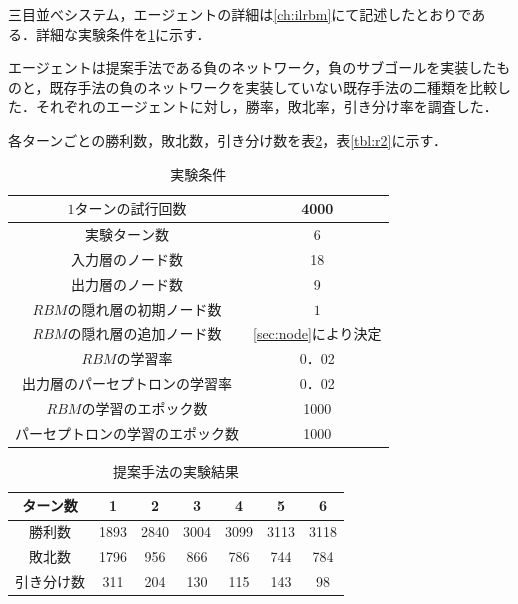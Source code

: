 三目並べシステム，エージェントの詳細は\ref{ch:ilrbm}にて記述したとおりである．詳細な実験条件を\ref{tbl:exp}に示す．

エージェントは提案手法である負のネットワーク，負のサブゴールを実装したものと，既存手法の負のネットワークを実装していない既存手法\cite{osawa}の二種類を比較した．それぞれのエージェントに対し，勝率，敗北率，引き分け率を調査した．

各ターンごとの勝利数，敗北数，引き分け数を表\ref{tbl:r1}，表\ref{tbl:r2}に示す．

\begin{table}[]
\begin{center}
	\caption{実験条件}
	\label{tbl:exp}
	\begin{tabular}{|c|c|}
		\hline
		$ 1ターンの試行回数					$	& 4000	\\ \hline
		$ 実験ターン数	$	& 6	\\ \hline
		$ 入力層のノード数 $	& 18	\\ \hline
		$ 出力層のノード数 $	& 9	\\ \hline
		$ RBMの隠れ層の初期ノード数 $& $1$\\ \hline
		$ RBMの隠れ層の追加ノード数		$	& \ref{sec:node}により決定	\\ \hline
		$ RBMの学習率					$	& 0．02	\\ \hline
		$ 出力層のパーセプトロンの学習率 $	& 0．02	\\ \hline
		$ RBMの学習のエポック数 $	& 1000	\\ \hline
		$ パーセプトロンの学習のエポック数 $	& 1000	\\ \hline
	\end{tabular}
\end{center}
\end{table}

\begin{table}[]
\begin{center}
	\caption{提案手法の実験結果}
	\label{tbl:r1}
	\begin{tabular}{|c|c|c|c|c|c|c|}
		\hline
		 ターン数　& 1 & 2 &3&4&5&6\\
		\hline
		勝利数	& 1893 & 2840 & 3004 & 3099 & 3113 & 3118 \\
		敗北数&	1796&956&866&786&744&784 \\
		引き分け数&311&204&130&115&143&98 \\
		\hline
	\end{tabular}
\end{center}
\end{table}

